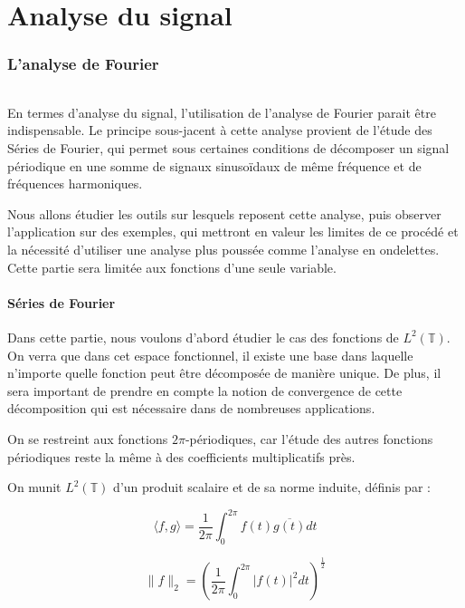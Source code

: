 \newpage
	\part{Analyse du signal}
	\section{L'analyse de Fourier}

	\paragraph*{}
En termes d'analyse du signal, l'utilisation de l'analyse de Fourier parait être indispensable. Le principe sous-jacent à cette analyse provient de l'étude des Séries de Fourier, qui permet sous certaines conditions de décomposer un signal périodique en une somme de signaux sinusoïdaux de même fréquence et de fréquences harmoniques. 

Nous allons étudier les outils sur lesquels reposent cette analyse, puis observer l'application sur des exemples, qui mettront en valeur les limites de ce procédé et la nécessité d'utiliser une analyse plus poussée comme l'analyse en ondelettes. Cette partie sera limitée aux fonctions d'une seule variable. 

	
	\subsection {Séries de Fourier}
		Dans cette partie, nous voulons d'abord étudier le cas des fonctions de $L^2(\mathbb{T})$. On verra que dans cet espace fonctionnel, il existe une base dans laquelle n'importe quelle fonction peut être décomposée de manière unique. De plus, il sera important de prendre en compte la notion de convergence de cette décomposition qui est nécessaire dans de nombreuses applications. 

		On se restreint aux fonctions $2\pi$-périodiques, car l'étude des autres fonctions périodiques reste la même à des coefficients multiplicatifs près. 	
		
			
		\begin{mydef} 
			
			On munit $L^2(\mathbb{T})$ d'un produit scalaire et de sa norme induite, définis par : 
			
			
			$$ \langle f,g \rangle = \frac{1}{2\pi} \int_{0}^{2\pi} f(t) \overline{g(t)} dt$$
				
			$$ \| f \|_2 =  \left( \frac{1}{2\pi} \int_0^{2\pi}| f(t) |^2 dt\right)^{\frac{1}{2}}$$	
				
		\end{mydef}		 
		 
